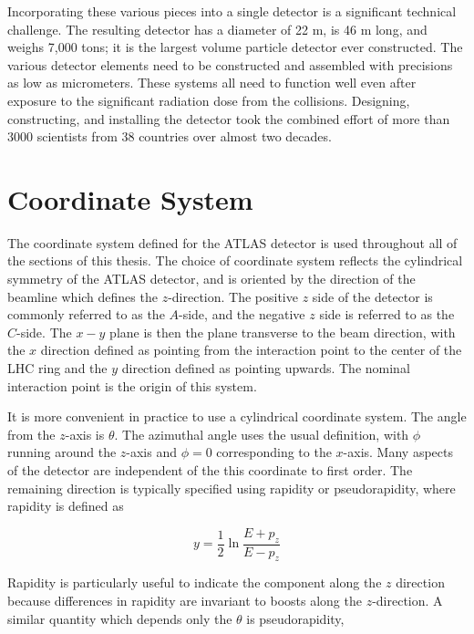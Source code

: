 Incorporating these various pieces into a single detector is a significant technical challenge.
The resulting detector has a diameter of 22 m, is 46 m long, and weighs 7,000 tons; it is the largest volume particle detector ever constructed.
The various detector elements need to be constructed and assembled with precisions as low as micrometers.
These systems all need to function well even after exposure to the significant radiation dose from the collisions.
Designing, constructing, and installing the detector took the combined effort of more than 3000 scientists from 38 countries over almost two decades.


\section{Coordinate System}

The coordinate system defined for the \ac{ATLAS} detector is used throughout all of the sections of this thesis.
The choice of coordinate system reflects the cylindrical symmetry of the \ac{ATLAS} detector, and is oriented by the direction of the beamline which defines the $z$-direction.
The positive $z$ side of the detector is commonly referred to as the $A$-side, and the negative $z$ side is referred to as the $C$-side.
The $x-y$ plane is then the plane transverse to the beam direction, with the $x$ direction defined as pointing from the interaction point to the center of the \ac{LHC} ring and the $y$ direction defined as pointing upwards.
The nominal interaction point is the origin of this system.

It is more convenient in practice to use a cylindrical coordinate system.
The angle from the $z$-axis is $\theta$.
The azimuthal angle uses the usual definition, with $\phi$ running around the $z$-axis and $\phi = 0$ corresponding to the $x$-axis.
Many aspects of the detector are independent of the this coordinate to first order.
The remaining direction is typically specified using rapidity or pseudorapidity, where rapidity is defined as

\begin{equation}\label{eq:rapidity}
y = \frac{1}{2} \ln \frac{E + p_z}{E - p_z}
\end{equation}

\noindent Rapidity is particularly useful to indicate the component along the $z$ direction because differences in rapidity are invariant to boosts along the $z$-direction.
A similar quantity which depends only the $\theta$ is pseudorapidity, 


